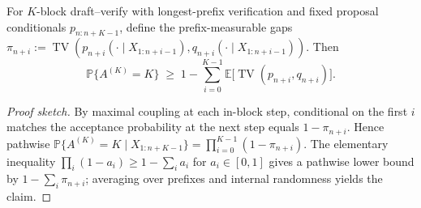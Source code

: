 \begin{proposition}\label{prop:block-tv-lower}
For $K$-block draft--verify with longest-prefix verification and fixed proposal conditionals $p_{n:n+K-1}$, define the prefix-measurable gaps $\pi_{n+i}:=\operatorname{TV}(p_{n+i}(\cdot\mid X_{1:n+i-1}),q_{n+i}(\cdot\mid X_{1:n+i-1}))$. Then
\[
\mathbb{P}\{A^{(K)}=K\}\;\ge\;1-\sum_{i=0}^{K-1}\mathbb{E}\big[\operatorname{TV}(p_{n+i},q_{n+i})\big].
\]
\end{proposition}

\begin{proof}[Proof sketch]
By maximal coupling at each in-block step, conditional on the first $i$ matches the acceptance probability at the next step equals $1-\pi_{n+i}$. Hence pathwise
\(
\mathbb P\{A^{(K)}=K\mid X_{1:n+K-1}\}=\prod_{i=0}^{K-1}(1-\pi_{n+i}).
\)
The elementary inequality $\prod_{i}(1-a_i)\ge 1-\sum_i a_i$ for $a_i\in[0,1]$ gives a pathwise lower bound by $1-\sum_i\pi_{n+i}$; averaging over prefixes and internal randomness yields the claim.\qedhere
\end{proof}

